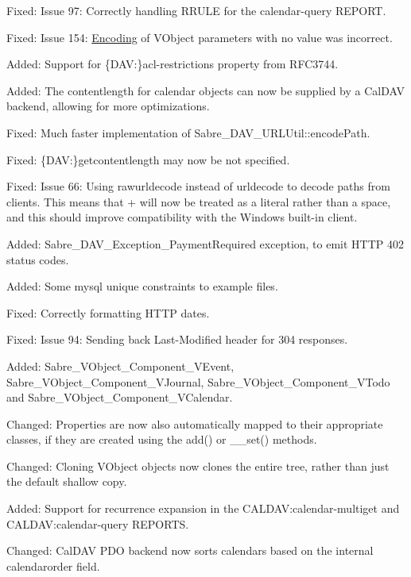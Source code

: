 \begin{DoxyItemize}
\item Fixed\+: Issue 97\+: Correctly handling R\+R\+U\+LE for the calendar-\/query R\+E\+P\+O\+RT.
\item Fixed\+: Issue 154\+: \mbox{\hyperlink{class_encoding}{Encoding}} of V\+Object parameters with no value was incorrect.
\item Added\+: Support for \{D\+AV\+:\}acl-\/restrictions property from R\+F\+C3744.
\item Added\+: The contentlength for calendar objects can now be supplied by a Cal\+D\+AV backend, allowing for more optimizations.
\item Fixed\+: Much faster implementation of Sabre\+\_\+\+D\+A\+V\+\_\+\+U\+R\+L\+Util\+::encode\+Path.
\item Fixed\+: \{D\+AV\+:\}getcontentlength may now be not specified.
\item Fixed\+: Issue 66\+: Using rawurldecode instead of urldecode to decode paths from clients. This means that + will now be treated as a literal rather than a space, and this should improve compatibility with the Windows built-\/in client.
\item Added\+: Sabre\+\_\+\+D\+A\+V\+\_\+\+Exception\+\_\+\+Payment\+Required exception, to emit H\+T\+TP 402 status codes.
\item Added\+: Some mysql unique constraints to example files.
\item Fixed\+: Correctly formatting H\+T\+TP dates.
\item Fixed\+: Issue 94\+: Sending back Last-\/\+Modified header for 304 responses.
\item Added\+: Sabre\+\_\+\+V\+Object\+\_\+\+Component\+\_\+\+V\+Event, Sabre\+\_\+\+V\+Object\+\_\+\+Component\+\_\+\+V\+Journal, Sabre\+\_\+\+V\+Object\+\_\+\+Component\+\_\+\+V\+Todo and Sabre\+\_\+\+V\+Object\+\_\+\+Component\+\_\+\+V\+Calendar.
\item Changed\+: Properties are now also automatically mapped to their appropriate classes, if they are created using the add() or \+\_\+\+\_\+set() methods.
\item Changed\+: Cloning V\+Object objects now clones the entire tree, rather than just the default shallow copy.
\item Added\+: Support for recurrence expansion in the C\+A\+L\+D\+AV\+:calendar-\/multiget and C\+A\+L\+D\+AV\+:calendar-\/query R\+E\+P\+O\+R\+TS.
\item Changed\+: Cal\+D\+AV P\+DO backend now sorts calendars based on the internal \textquotesingle{}calendarorder\textquotesingle{} field.

\end{DoxyItemize}

